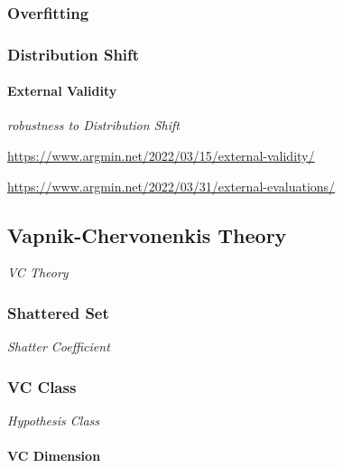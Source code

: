 \subsubsection{Overfitting}\label{sec:overfitting}

\subsubsection{Distribution Shift}\label{sec:distribution_shift}

\paragraph{External Validity}\label{sec:external_validity}\hfill

\emph{robustness to Distribution Shift}

\url{https://www.argmin.net/2022/03/15/external-validity/}

\url{https://www.argmin.net/2022/03/31/external-evaluations/}



\subsection{Vapnik-Chervonenkis Theory}\label{sec:vc_theory}

\emph{VC Theory}



\subsubsection{Shattered Set}\label{sec:shattered_set}

\emph{Shatter Coefficient}



\subsubsection{VC Class}\label{sec:vc_class}

\emph{Hypothesis Class}



\paragraph{VC Dimension}\label{sec:vc_dimension}\hfill


